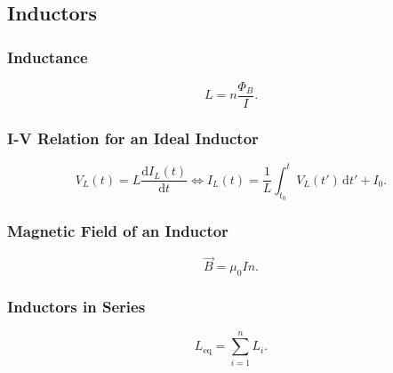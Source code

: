 \begin{symbols}
\end{symbols}

\subsection{Inductors}
\subsubsection{Inductance}
\begin{equation*}
  L = n \frac{\Phi_B}{I}
.\end{equation*}

\begin{symbols}
\end{symbols}

\subsubsection{I-V Relation for an Ideal Inductor}
\begin{equation*}
  V_L (t) = L \frac{\mathrm{d}I_L(t)}{\mathrm{d}t} \iff I_L (t) = \frac{1}{L} \int_{t_0}^{t} V_L (t') \, \mathrm{d}t' + I_0
.\end{equation*}


\begin{symbols}
\end{symbols}


\subsubsection{Magnetic Field of an Inductor}
\begin{equation*}
  \Vec{B} = \mu_0 I n
.\end{equation*}

\begin{symbols}
\end{symbols}

\subsubsection{Inductors in Series}
\begin{equation*}
  L_{\mathrm{eq}} = \sum_{i = 1}^{n} L_i
.\end{equation*}

